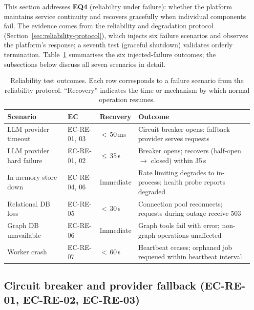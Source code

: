\documentclass[a4paper]{sapthesis}
\begin{document}
This section addresses \textbf{EQ4} (reliability under failure): whether
the platform maintains service continuity and recovers gracefully when
individual components fail.  The evidence comes from the reliability and
degradation protocol (Section~\ref{sec:reliability-protocol}), which
injects six failure scenarios and observes the platform's response; a
seventh test (graceful shutdown) validates orderly termination.
Table~\ref{tab:reliability-results} summarises the six injected-failure
outcomes; the subsections below discuss all seven scenarios in detail.

\begin{table}[ht]
\centering
\caption{Reliability test outcomes.  Each row corresponds to a failure
scenario from the reliability protocol.  ``Recovery'' indicates the time
or mechanism by which normal operation resumes.}
\label{tab:reliability-results}
\small
\begin{tabularx}{\textwidth}{@{}l l l X@{}}
    \hline
    \textbf{Scenario} & \textbf{EC} & \textbf{Recovery} &
        \textbf{Outcome} \\
    \hline
    LLM provider timeout &
        EC-RE-01, 03 &
        $<$\,50\,ms &
        Circuit breaker opens; fallback provider serves requests \\
    LLM provider hard failure &
        EC-RE-01, 02 &
        $\leq$\,35\,s &
        Breaker opens; recovers (half-open $\to$ closed) within 35\,s \\
    In-memory store down &
        EC-RE-04, 06 &
        Immediate &
        Rate limiting degrades to in-process; health probe reports
        degraded \\
    Relational DB loss &
        EC-RE-05 &
        $<$\,30\,s &
        Connection pool reconnects; requests during outage receive
        503 \\
    Graph DB unavailable &
        EC-RE-06 &
        Immediate &
        Graph tools fail with error; non-graph operations unaffected \\
    Worker crash &
        EC-RE-07 &
        $<$\,60\,s &
        Heartbeat ceases; orphaned job requeued within heartbeat
        interval \\
    \hline
\end{tabularx}
\end{table}

\subsection{Circuit breaker and provider fallback (EC-RE-01, EC-RE-02,
EC-RE-03)}
\end{document}
